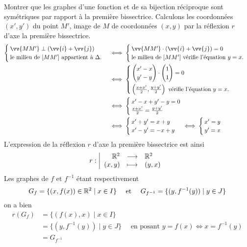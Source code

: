 \documentclass{article}
\renewenvironment{question_kholle}[2][ ]
{
	\subsection{\texorpdfstring{#2}{}}
	\notblank{#1}
	{
		\noindent #1
		\bigbreak
	}
	{}
	\begin{proof}
}
{
	\end{proof}
}
\begin{document}
\begin{question_kholle}{Montrer que les graphes d'une fonction et de sa bijection réciproque sont symétriques par rapport à la première bissectrice.}
	Calculons les coordonnées $(x',y')$ du point $M'$, image de $M$ de coordonnées $(x,y)$ par la réflexion $r$ d'axe la première bissectrice.
	\begin{align*}
		\begin{cases}
			\vv{MM'}\perp (\vv{i}+\vv{j}) \\
			\text{le milieu de $[MM']$ appartient à $\Delta$.}
		\end{cases}
		 & \iff
		\begin{cases}
			\vv{MM'}\cdot (\vv{i}+\vv{j})=0 \\
			\text{le milieu de $[MM']$ vérifie l'équation $y=x$.}
		\end{cases} \\
		 & \iff
		\begin{cases}
			\begin{pmatrix}x'-x\\y'-y\end{pmatrix}\cdot \begin{pmatrix}1\\1\end{pmatrix}=0 \\[12pt]
			\left(\frac{x+x'}{2},\frac{y+y'}{2}\right) \text{ vérifie l'équation $y=x$.}
		\end{cases}            \\
		 & \iff
		\begin{cases}
			x'-x+y'-y=0 \\
			\frac{x+x'}{2}=\frac{y+y'}{2}
		\end{cases}                                                           \\
		 & \iff
		\begin{cases}
			x'+y'=x+y \\
			x'-y'=-x+y
		\end{cases}
		\iff
		\begin{cases}
			x'=y \\
			y'=x
		\end{cases}
	\end{align*}
	L'expression de la réflexion $r$ d'axe la première bissectrice est ainsi
	\[
		r:\left|
		\begin{array}{rcl}
			\mathbb R^2  & \longrightarrow & \mathbb R^2  \\
			(x,y) & \longmapsto     & (y,x) \\
		\end{array}
		\right.
	\]
	Les graphes de $f$ et $f^{-1}$ étant respectivement
	\[
		G_f = \{(x,f(x))\in\mathbb R^2 \mid x\in I\} \quad\text{ et }\quad G_{f^{-1}}=\{(y,f^{-1}(y)) \mid y\in J\}
	\]
	on a bien
	\begin{align*}
		r(G_f) & =\{(f(x),x) \mid x\in I\}                                                      \\
		       & =\{(y,f^{-1}(y)) \mid y\in J\}\quad\text{ en posant $y=f(x) \iff x=f^{-1}(y)$} \\
		       & = G_{f^{-1}}
	\end{align*}
\end{question_kholle}
\end{document}
